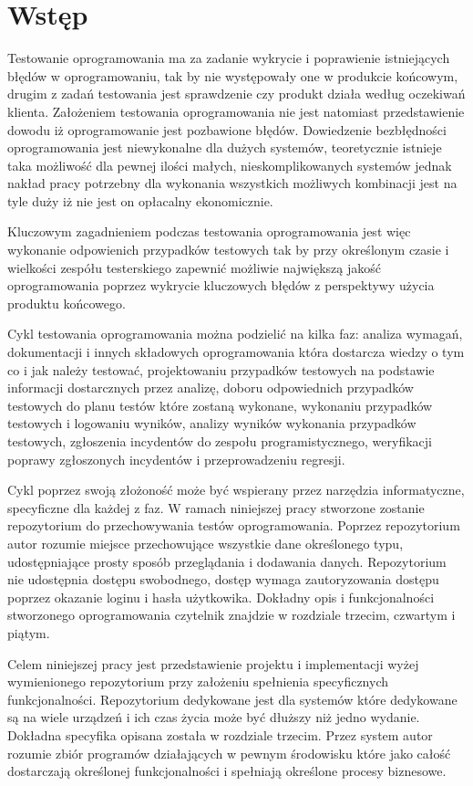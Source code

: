 \chapter{Wstęp}
Testowanie oprogramowania ma za zadanie wykrycie i poprawienie istniejących błędów w oprogramowaniu, tak by nie występowały one w produkcie końcowym, drugim z zadań testowania jest sprawdzenie czy produkt działa według oczekiwań klienta. Założeniem testowania oprogramowania nie jest natomiast przedstawienie dowodu iż oprogramowanie jest pozbawione błędów. Dowiedzenie bezbłędności oprogramowania jest niewykonalne dla dużych systemów, teoretycznie istnieje taka możliwość dla pewnej ilości małych, nieskomplikowanych systemów jednak nakład pracy potrzebny dla wykonania wszystkich możliwych kombinacji jest na tyle duży iż nie jest on opłacalny ekonomicznie. 

Kluczowym zagadnieniem podczas testowania oprogramowania jest więc wykonanie odpowienich przypadków testowych tak by przy określonym czasie i wielkości zespółu testerskiego zapewnić możliwie największą jakość oprogramowania poprzez wykrycie kluczowych błędów z perspektywy użycia produktu końcowego.  

Cykl testowania oprogramowania można podzielić na kilka faz: analiza wymagań, dokumentacji i innych składowych oprogramowania która dostarcza wiedzy o tym co i jak należy testować, projektowaniu przypadków testowych na podstawie informacji dostarcznych przez analizę, doboru odpowiednich przypadków testowych do planu testów które zostaną wykonane, wykonaniu przypadków testowych i logowaniu wyników, analizy wyników wykonania przypadków testowych, zgłoszenia incydentów do zespołu programistycznego, weryfikacji poprawy zgłoszonych incydentów i przeprowadzeniu regresji.

Cykl poprzez swoją złożoność może być wspierany przez narzędzia informatyczne, specyficzne dla każdej z faz. W ramach niniejszej pracy stworzone zostanie repozytorium do przechowywania testów oprogramowania. Poprzez repozytorium autor rozumie miejsce przechowujące wszystkie dane określonego typu, udostępniające prosty sposób przeglądania i dodawania danych. Repozytorium nie udostępnia dostępu swobodnego, dostęp wymaga zautoryzowania dostępu poprzez okazanie loginu i hasła użytkowika. Dokładny opis i funkcjonalności stworzonego oprogramowania czytelnik znajdzie w rozdziale trzecim, czwartym i piątym. 

Celem niniejszej pracy jest przedstawienie projektu i implementacji wyżej wymienionego repozytorium przy założeniu spełnienia specyficznych funkcjonalności. Repozytorium dedykowane jest dla systemów które dedykowane są na wiele urządzeń i ich czas życia może być dłuższy niż jedno wydanie. Dokładna specyfika opisana została w rozdziale trzecim. Przez system autor rozumie zbiór programów działających w pewnym środowisku które jako całość dostarczają określonej funkcjonalności i spełniają określone procesy biznesowe. 
